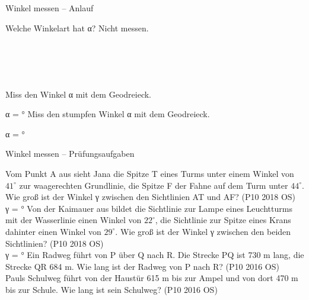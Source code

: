 \setcounter{aufgabe}{47}

\begin{aufgabe}{Winkel messen – Anlauf}
\begin{teile}
\teil Welche Winkelart hat α? Nicht messen. \\  \\  \\  \\  \\ 

\teil Miss den Winkel α mit dem Geodreieck.

α = \leerfeld °
\teil Miss den stumpfen Winkel α mit dem Geodreieck.

α = \leerfeld °
\end{teile}
\end{aufgabe}

\begin{aufgabe}{Winkel messen – Prüfungsaufgaben}
\begin{teile}
\teil Vom Punkt A aus sieht Jana die Spitze T eines Turms unter einem Winkel von $41^\circ$ zur waagerechten Grundlinie, die Spitze F der Fahne auf dem Turm unter $44^\circ$. Wie groß ist der Winkel γ zwischen den Sichtlinien AT und AF? \hfill (P10 2018 OS) \\ γ = \leerfeld °
\teil Von der Kaimauer aus bildet die Sichtlinie zur Lampe eines Leuchtturms mit der Wasserlinie einen Winkel von $22^\circ$, die Sichtlinie zur Spitze eines Krans dahinter einen Winkel von $29^\circ$. Wie groß ist der Winkel γ zwischen den beiden Sichtlinien? \hfill (P10 2018 OS) \\ γ = \leerfeld °
\teil Ein Radweg führt von P über Q nach R. Die Strecke PQ ist 730 m lang, die Strecke QR 684 m. Wie lang ist der Radweg von P nach R? \hfill (P10 2016 OS) \\ \leerfeld[m]
\teil Pauls Schulweg führt von der Haustür 615 m bis zur Ampel und von dort 470 m bis zur Schule. Wie lang ist sein Schulweg? \hfill (P10 2016 OS) \\ \leerfeld[m]
\end{teile}
\end{aufgabe}

